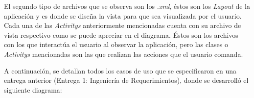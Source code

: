 \documentclass{memoria}
\begin{document}
El segundo tipo de archivos que se observa son los \textsl{.xml}, éstos son los \textsl{Layout} de la aplicación y es donde se diseña la vista para que sea visualizada por el usuario. Cada una de las \textsl{Activitys} anteriormente mencionadas cuenta con su archivo de vista respectivo como se puede apreciar en el diagrama. Éstos son los archivos con los que interactúa el usuario al observar la aplicación, pero las clases o \textsl{Activitys} mencionadas son las que realizan las acciones que el usuario comanda.
 

A continuación, se detallan todos los casos de uso que se especificaron en una entrega anterior (Entrega 1: Ingeniería de Requerimientos), donde se desarrolló el siguiente diagrama:

\end{document}
